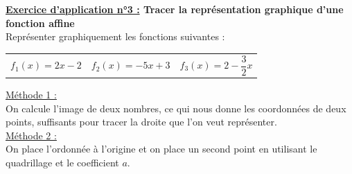 \documentclass[12pt]{article}
\begin{document}
\begin{mdframed}[
    linewidth=1pt,
    roundcorner=5pt,
    linecolor=RoyalBlue,
]
{\color{RoyalBlue}\textbf{\underline{Exercice d'application n°3 :} Tracer la représentation graphique
d'une fonction affine}}
\\Représenter graphiquement les fonctions suivantes :
\begin{center}
    \setlength{\tabcolsep}{15pt}
    \begin{tabular}{ccc}
        $f_1(x) = 2x - 2$
        &
        $f_2(x) = -5x + 3$
        &
        $f_3(x) = 2 - \dfrac{3}{2}x$
    \end{tabular}
\end{center}

\begin{mdframed}[
    linewidth=0.5pt,
    roundcorner=5pt,
    linecolor=black,
    backgroundcolor=black!6
]
\underline{Méthode 1 :}
\vspace{5pt}
\\On calcule l'image de deux nombres, ce qui nous donne les coordonnées de deux points, suffisants
pour tracer la droite que l'on veut représenter.
\vspace{5pt}
\\
\underline{Méthode 2 :}
\vspace{5pt}
\\On place l'ordonnée à l'origine et on place un second point en utilisant le quadrillage et le 
coefficient $a$.
\end{mdframed}

\end{mdframed}
\end{document}
